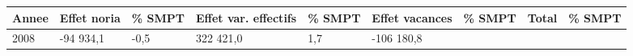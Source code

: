 \begin{longtable}[]{@{}lllllllll@{}}
\toprule
\begin{minipage}[b]{0.05\columnwidth}\raggedright
Annee\strut
\end{minipage} & \begin{minipage}[b]{0.10\columnwidth}\raggedright
Effet noria\strut
\end{minipage} & \begin{minipage}[b]{0.06\columnwidth}\raggedright
\% SMPT\strut
\end{minipage} & \begin{minipage}[b]{0.17\columnwidth}\raggedright
Effet var. effectifs\strut
\end{minipage} & \begin{minipage}[b]{0.06\columnwidth}\raggedright
\% SMPT\strut
\end{minipage} & \begin{minipage}[b]{0.12\columnwidth}\raggedright
Effet vacances\strut
\end{minipage} & \begin{minipage}[b]{0.06\columnwidth}\raggedright
\% SMPT\strut
\end{minipage} & \begin{minipage}[b]{0.08\columnwidth}\raggedright
Total\strut
\end{minipage} & \begin{minipage}[b]{0.06\columnwidth}\raggedright
\% SMPT\strut
\end{minipage}\tabularnewline
\midrule
\endhead
\begin{minipage}[t]{0.05\columnwidth}\raggedright
2008\strut
\end{minipage} & \begin{minipage}[t]{0.10\columnwidth}\raggedright
-94 934,1\strut
\end{minipage} & \begin{minipage}[t]{0.06\columnwidth}\raggedright
-0,5\strut
\end{minipage} & \begin{minipage}[t]{0.17\columnwidth}\raggedright
322 421,0\strut
\end{minipage} & \begin{minipage}[t]{0.06\columnwidth}\raggedright
1,7\strut
\end{minipage} & \begin{minipage}[t]{0.12\columnwidth}\raggedright
-106 180,8\strut
\end{minipage} & \begin{minipage}[t]{0.06\columnwidth}\raggedright

\end{minipage}
\end{longtable}
